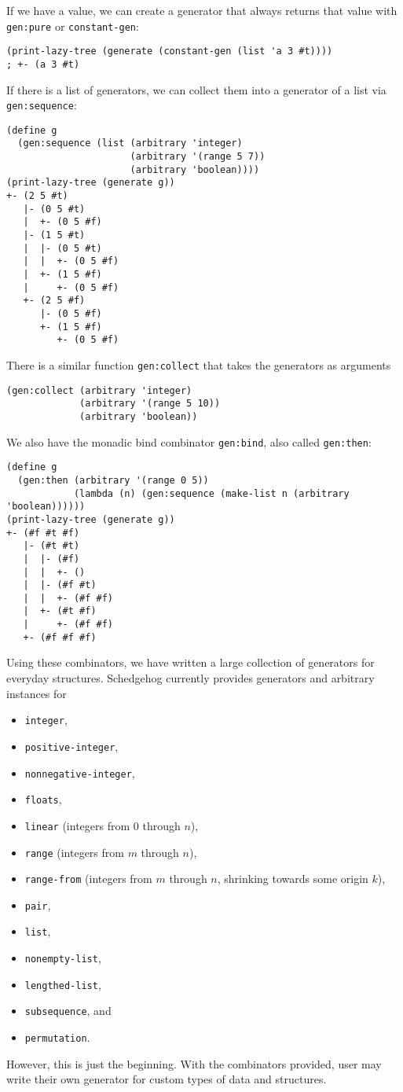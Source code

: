 \documentclass{scrartcl}
\begin{document}
If we have a value, we can create a generator that always returns
that value with \verb|gen:pure| or \verb|constant-gen|:
\begin{verbatim}
(print-lazy-tree (generate (constant-gen (list 'a 3 #t))))
; +- (a 3 #t)
\end{verbatim}

If there is a list of generators, we can collect them into a generator of a list
via \verb|gen:sequence|:
\begin{verbatim}
(define g
  (gen:sequence (list (arbitrary 'integer)
                      (arbitrary '(range 5 7))
                      (arbitrary 'boolean))))
(print-lazy-tree (generate g))
+- (2 5 #t)
   |- (0 5 #t)
   |  +- (0 5 #f)
   |- (1 5 #t)
   |  |- (0 5 #t)
   |  |  +- (0 5 #f)
   |  +- (1 5 #f)
   |     +- (0 5 #f)
   +- (2 5 #f)
      |- (0 5 #f)
      +- (1 5 #f)
         +- (0 5 #f)
\end{verbatim}

There is a similar function \verb|gen:collect| that takes the generators
as arguments
\begin{verbatim}
(gen:collect (arbitrary 'integer)
             (arbitrary '(range 5 10))
             (arbitrary 'boolean))
\end{verbatim}

We also have the monadic bind combinator \verb|gen:bind|,
also called \verb|gen:then|:
\begin{verbatim}
(define g
  (gen:then (arbitrary '(range 0 5))
            (lambda (n) (gen:sequence (make-list n (arbitrary 'boolean))))))
(print-lazy-tree (generate g))
+- (#f #t #f)
   |- (#t #t)
   |  |- (#f)
   |  |  +- ()
   |  |- (#f #t)
   |  |  +- (#f #f)
   |  +- (#t #f)
   |     +- (#f #f)
   +- (#f #f #f)
\end{verbatim}

Using these combinators, we have written a large collection of
generators for everyday structures.
Schedgehog currently provides generators and arbitrary instances for
\begin{itemize}
  \item \verb|integer|,
  \item \verb|positive-integer|,
  \item \verb|nonnegative-integer|,
  \item \verb|floats|,
  \item \verb|linear| (integers from \(0\) through \(n\)),
  \item \verb|range| (integers from \(m\) through \(n\)),
  \item \verb|range-from| (integers from \(m\) through \(n\),
                           shrinking towards some origin \(k\)),
  \item \verb|pair|,
  \item \verb|list|,
  \item \verb|nonempty-list|,
  \item \verb|lengthed-list|,
  \item \verb|subsequence|, and
  \item \verb|permutation|.
\end{itemize}
However, this is just the beginning.
With the combinators provided, user may write their own
generator for custom types of data and structures.
\end{document}
